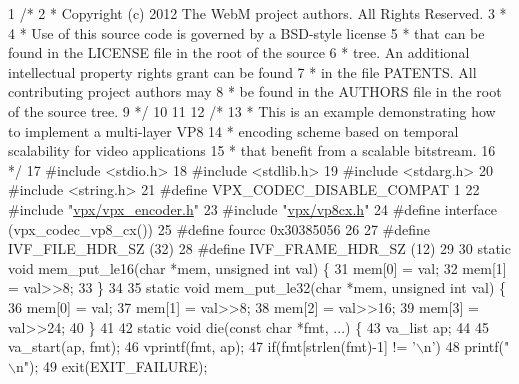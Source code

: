 \begin{DoxyCodeInclude}
1 \textcolor{comment}{/*}
2 \textcolor{comment}{ *  Copyright (c) 2012 The WebM project authors. All Rights Reserved.}
3 \textcolor{comment}{ *}
4 \textcolor{comment}{ *  Use of this source code is governed by a BSD-style license}
5 \textcolor{comment}{ *  that can be found in the LICENSE file in the root of the source}
6 \textcolor{comment}{ *  tree. An additional intellectual property rights grant can be found}
7 \textcolor{comment}{ *  in the file PATENTS.  All contributing project authors may}
8 \textcolor{comment}{ *  be found in the AUTHORS file in the root of the source tree.}
9 \textcolor{comment}{ */}
10 
11 
12 \textcolor{comment}{/*}
13 \textcolor{comment}{ * This is an example demonstrating how to implement a multi-layer VP8}
14 \textcolor{comment}{ * encoding scheme based on temporal scalability for video applications}
15 \textcolor{comment}{ * that benefit from a scalable bitstream.}
16 \textcolor{comment}{ */}
17 \textcolor{preprocessor}{#include <stdio.h>}
18 \textcolor{preprocessor}{#include <stdlib.h>}
19 \textcolor{preprocessor}{#include <stdarg.h>}
20 \textcolor{preprocessor}{#include <string.h>}
21 \textcolor{preprocessor}{#define VPX\_CODEC\_DISABLE\_COMPAT 1}
22 \textcolor{preprocessor}{#include "\hyperlink{vpx__encoder_8h}{vpx/vpx\_encoder.h}"}
23 \textcolor{preprocessor}{#include "\hyperlink{vp8cx_8h}{vpx/vp8cx.h}"}
24 \textcolor{preprocessor}{#define interface (vpx\_codec\_vp8\_cx())}
25 \textcolor{preprocessor}{#define fourcc    0x30385056}
26 
27 \textcolor{preprocessor}{#define IVF\_FILE\_HDR\_SZ  (32)}
28 \textcolor{preprocessor}{#define IVF\_FRAME\_HDR\_SZ (12)}
29 
30 \textcolor{keyword}{static} \textcolor{keywordtype}{void} mem\_put\_le16(\textcolor{keywordtype}{char} *mem, \textcolor{keywordtype}{unsigned} \textcolor{keywordtype}{int} val) \{
31     mem[0] = val;
32     mem[1] = val>>8;
33 \}
34 
35 \textcolor{keyword}{static} \textcolor{keywordtype}{void} mem\_put\_le32(\textcolor{keywordtype}{char} *mem, \textcolor{keywordtype}{unsigned} \textcolor{keywordtype}{int} val) \{
36     mem[0] = val;
37     mem[1] = val>>8;
38     mem[2] = val>>16;
39     mem[3] = val>>24;
40 \}
41 
42 \textcolor{keyword}{static} \textcolor{keywordtype}{void} die(\textcolor{keyword}{const} \textcolor{keywordtype}{char} *fmt, ...) \{
43     va\_list ap;
44 
45     va\_start(ap, fmt);
46     vprintf(fmt, ap);
47     \textcolor{keywordflow}{if}(fmt[strlen(fmt)-1] != \textcolor{charliteral}{'\(\backslash\)n'})
48         printf(\textcolor{stringliteral}{"\(\backslash\)n"});
49     exit(EXIT\_FAILURE);

\end{DoxyCodeInclude}
